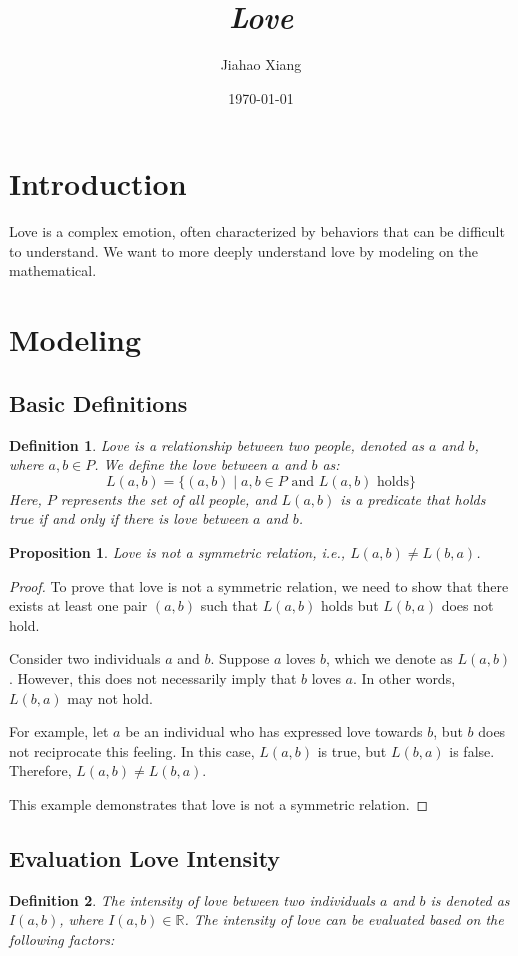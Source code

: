 \documentclass{article}
\title{\textit{Love}}
\author{Jiahao Xiang}
\date{\today}
\newtheorem{definition}{Definition}
\newtheorem{proposition}{Proposition}
\begin{document}
\maketitle

\section{Introduction}
Love is a complex emotion, often characterized by behaviors that can be difficult to understand. We want to more deeply understand love by modeling on the mathematical.

\section{Modeling}
\subsection{Basic Definitions}

\begin{definition}
    Love is a relationship between two people, denoted as $a$ and $b$, where $a, b \in P$. We define the love between $a$ and $b$ as:
    \[
        L(a, b) = \{(a, b) \mid a, b \in P \text{ and } L(a, b) \text{ holds}\}
    \]
    Here, $P$ represents the set of all people, and $L(a, b)$ is a predicate that holds true if and only if there is love between $a$ and $b$.
\end{definition}


\begin{proposition}
    Love is not a symmetric relation, i.e., $L(a,b) \neq L(b,a)$.
\end{proposition}

\begin{proof}
    To prove that love is not a symmetric relation, we need to show that there exists at least one pair $(a, b)$ such that $L(a, b)$ holds but $L(b, a)$ does not hold.

    Consider two individuals $a$ and $b$. Suppose $a$ loves $b$, which we denote as $L(a, b)$. However, this does not necessarily imply that $b$ loves $a$. In other words, $L(b, a)$ may not hold.

    For example, let $a$ be an individual who has expressed love towards $b$, but $b$ does not reciprocate this feeling. In this case, $L(a, b)$ is true, but $L(b, a)$ is false. Therefore, $L(a, b) \neq L(b, a)$.

    This example demonstrates that love is not a symmetric relation.
\end{proof}

\subsection{Evaluation Love Intensity}

\begin{definition}
    The intensity of love between two individuals $a$ and $b$ is denoted as $I(a, b)$, where $I(a, b) \in \mathbb{R}$. The intensity of love can be evaluated based on the following factors:
 
\end{definition}
\end{document}
